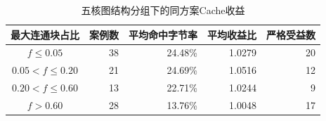 \begin{table}[htbp]\centering
\caption{五核图结构分组下的同方案Cache收益}\label{tab:q3-structure-cache}
\small
\begin{tabular}{c r r r r}
\toprule
最大连通块占比 & 案例数 & 平均命中字节率 & 平均收益比 & 严格受益数 \\
\midrule
$f\leq0.05$ & 38 & 24.48\% & 1.0279 & 20 \\
$0.05<f\leq0.20$ & 21 & 24.69\% & 1.0516 & 12 \\
$0.20<f\leq0.60$ & 13 & 22.71\% & 1.0244 & 9 \\
$f>0.60$ & 28 & 13.76\% & 1.0048 & 17 \\
\bottomrule
\end{tabular}
\end{table}
